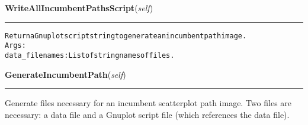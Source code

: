     \label{coinor:grumpy:BB:BBTree:WriteAllIncumbentPathsScript}

    \vspace{0.5ex}

\hspace{.8\funcindent}\begin{boxedminipage}{\funcwidth}

    \raggedright \textbf{WriteAllIncumbentPathsScript}(\textit{self})

    \vspace{-1.5ex}

    \rule{\textwidth}{0.5\fboxrule}
\setlength{\parskip}{2ex}
\begin{alltt}

Return a Gnuplot script string to generate an incumbent path image.
Args:
  data\_filenames: List of string names of files.
\end{alltt}

\setlength{\parskip}{1ex}
    \end{boxedminipage}

    \label{coinor:grumpy:BB:BBTree:GenerateIncumbentPath}

    \vspace{0.5ex}

\hspace{.8\funcindent}\begin{boxedminipage}{\funcwidth}

    \raggedright \textbf{GenerateIncumbentPath}(\textit{self})

    \vspace{-1.5ex}

    \rule{\textwidth}{0.5\fboxrule}
\setlength{\parskip}{2ex}
    Generate files necessary for an incumbent scatterplot path image. Two 
    files are necessary: a data file and a Gnuplot script file (which 
    references the data file).

\setlength{\parskip}{1ex}
    \end{boxedminipage}

    \label{coinor:grumpy:BB:BBTree:GenerateAllIncumbentPaths}

